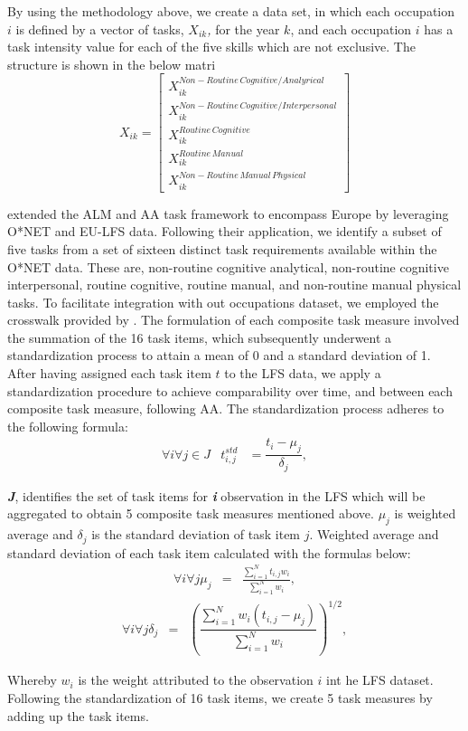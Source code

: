 \begin{onehalfspace}
By using the methodology above, we create a data set, in which each
occupation \emph{$i$} is defined by a vector of tasks, \emph{$X_{ik}$,
}for the year $k$, and each occupation \emph{$i$} has a task intensity
value for each of the five skills which are not exclusive. The structure
is shown in the below matri
\[
X_{ik}=\left[\begin{array}{c}
X_{ik}^{Non-Routine\,Cognitive/Analyrical}\\
X_{ik}^{Non-Routine\,Cognitive/Interpersonal}\\
X_{ik}^{Routine\,Cognitive}\\
X_{ik}^{Routine\,Manual}\\
X_{ik}^{Non-Routine\,Manual\,Physical}
\end{array}\right]
\]

\citet{2018Hardy} extended the ALM and AA task framework to encompass
Europe by leveraging O{*}NET and EU-LFS data. Following their application,
we identify a subset of five tasks from a set of sixteen distinct
task requirements available within the O{*}NET data. These are, non-routine
cognitive analytical, non-routine cognitive interpersonal, routine
cognitive, routine manual, and non-routine manual physical tasks.
To facilitate integration with out occupations dataset, we employed
the crosswalk provided by \citet{2018Hardy}. The formulation of each
composite task measure involved the summation of the 16 task items,
which subsequently underwent a standardization process to attain a
mean of 0 and a standard deviation of 1. After having assigned each
task item $t$ to the LFS data, we apply a standardization procedure
to achieve comparability over time, and between each composite task
measure, following AA. The standardization process adheres to the
following formula:
\begin{eqnarray}
\forall i\forall j\in J & t_{i,j}^{std} & =\dfrac{t_{i}-\mu_{j}}{\delta_{j}},\label{eq:4}
\end{eqnarray}

\textbf{\textit{J}}, identifies the set of task items for \textbf{\textit{i}}
observation in the LFS which will be aggregated to obtain 5 composite
task measures mentioned above. $\mu_{j}$ is weighted average and
$\delta_{j}$ is the standard deviation of task item $j$. Weighted
average and standard deviation of each task item calculated with the
formulas below:
\begin{eqnarray}
\forall i\forall j\mu_{j} & = & \frac{\sum_{i=1}^{N}t_{i,j}w_{i}}{\sum_{i=1}^{N}w_{i}},\label{eq:mean}
\end{eqnarray}
\begin{eqnarray}
\forall i\forall j\delta_{j} & = & \left(\dfrac{\sum_{i=1}^{N}w_{i}(t_{i,j}-\mu_{j})}{\sum_{i=1}^{N}w_{i}}\right)^{1/2},\label{eq:standart_dev}
\end{eqnarray}

Whereby $w_{i}$ is the weight attributed to the observation \textbf{\textit{$i$}}
int he LFS dataset. Following the standardization of 16 task items,
we create 5 task measures by adding up the task items.
\end{onehalfspace}

